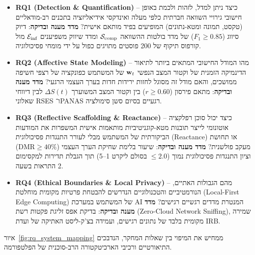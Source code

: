 \begin{itemize}
    \item \textbf{\textenglish{RQ1 (Detection \& Quantification)}} -- כיצד ניתן למדל, לזהות ולכמת באופן חישובי גירויי השוואה חברתית כלפי מעלה ואינדקסי אידיאליזציה בתכנים רב-מודאליים (טקסט, תמונה ומטא-נתונים) המופיעים בפיד מותאם אישית?
    \newline \textbf{מדד מענה ובדיקה}: דיוק סיווג ($F_1 \ge 0.85$) של מדד בולטות ההשוואה $\mathcal{S}_{\text{comp}}{}$ ומדד שיווק משפיענים $\mathcal{E}_{\text{inf}}{}$ מול קורפוס תיקוף של 200 פוסטים מתויגים כפול על ידי מומחי פסיכולוגיה.
    \item \textbf{\textenglish{RQ2 (Affective State Modeling)}} -- מהו המודל החישובי המתאים ביותר לתיאור הדינמיקה הזמנית של וקטור המצב הנפשי $\mathbf{w}_t{}$ של המשתמש כפונקציה של רצפי חשיפה ממושכים, והאם מודל זה מסוגל לחזות ירידות חדות בערך העצמי הרגעי?
    \newline \textbf{מדד מענה ובדיקה}: מתאם פירסון ($r \ge 0.60$) בין וקטור המצב המשוערך $\Delta S(t)$ לבין דיווחי שאלוני \textenglish{RSES} ו־\textenglish{PANAS} רגעיים בסיום סשן סימולציה.
    \item \textbf{\textenglish{RQ3 (Reflective Scaffolding \& Reactance)}} -- כיצד יכול סוכן רפלקציה אוטונומי לייצר תובנות מטא-קוגניטיביות מותאמות אישית המשפרות את המודעות הביקורתית של המשתמש מבלי לעורר התנגדות פסיכולוגית (\textenglish{Reactance}) או תחושת מעקב פולשנית?
    \newline \textbf{מדד מענה ובדיקה}: שיעור בלימת שחיקת הערך העצמי ($\text{DMR} \ge 40\%$) וציון התנגדות פסיכולוגית נמוך ($\le 2.0$ בסולם ליקרט 1--5) תוך הגבלת תדירות למקסימום 2 התראות בשעה.
    \item \textbf{\textenglish{RQ4 (Ethical Boundaries \& Local Privacy)}} -- מהם הגבולות האתיים, הנורמטיביים והטכנולוגיים הנדרשים להבטחת פרטיות מקומית מוחלטת (\textenglish{Local-First Edge Computing}) של המשתמש במערכת AI המנטרת מדדים רגשיים רגישים?
    \newline \textbf{מדד מענה ובדיקה}: בדיקת אפס זליגת פקטות רשת (\textenglish{Zero-Cloud Network Sniffing}), שמירה מקומית בלבד של נתונים רגישים, ועמידה בצ'ק-ליסט האתיקה של ועדת \textenglish{IRB}.
\end{itemize}

איור~\ref{fig:rq_system_mapping} ממחיש את המיפוי בין שאלות המחקר, הנדבכים התיאורטיים ורכיבי הארכיטקטורה הרב-סוכנית של הפלטפורמה.


